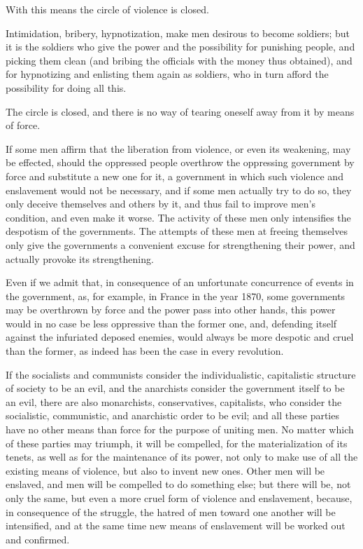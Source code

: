 \documentclass{book}
\begin{document}
With this means the circle of violence is closed.

Intimidation, bribery, hypnotization, make men desirous to become soldiers; but it is the soldiers who give the power and the possibility for punishing people, and picking them clean (and bribing the officials with the money thus obtained), and for hypnotizing and enlisting them again as soldiers, who in turn afford the possibility for doing all this.

The circle is closed, and there is no way of tearing oneself away from it by means of force.

If some men affirm that the liberation from violence, or even its weakening, may be effected, should the oppressed people overthrow the oppressing government by force and substitute a new one for it, a government in which such violence and enslavement would not be necessary, and if some men actually try to do so, they only deceive themselves and others by it, and thus fail to improve men’s condition, and even make it worse. The activity of these men only intensifies the despotism of the governments. The attempts of these men at freeing themselves only give the governments a convenient excuse for strengthening their power, and actually provoke its strengthening.

Even if we admit that, in consequence of an unfortunate concurrence of events in the government, as, for example, in France in the year 1870, some governments may be overthrown by force and the power pass into other hands, this power would in no case be less oppressive than the former one, and, defending itself against the infuriated deposed enemies, would always be more despotic and cruel than the former, as indeed has been the case in every revolution.

If the socialists and communists consider the individualistic, capitalistic structure of society to be an evil, and the anarchists consider the government itself to be an evil, there are also monarchists, conservatives, capitalists, who consider the socialistic, communistic, and anarchistic order to be evil; and all these parties have no other means than force for the purpose of uniting men. No matter which of these parties may triumph, it will be compelled, for the materialization of its tenets, as well as for the maintenance of its power, not only to make use of all the existing means of violence, but also to invent new ones. Other men will be enslaved, and men will be compelled to do something else; but there will be, not only the same, but even a more cruel form of violence and enslavement, because, in consequence of the struggle, the hatred of men toward one another will be intensified, and at the same time new means of enslavement will be worked out and confirmed.
\end{document}
